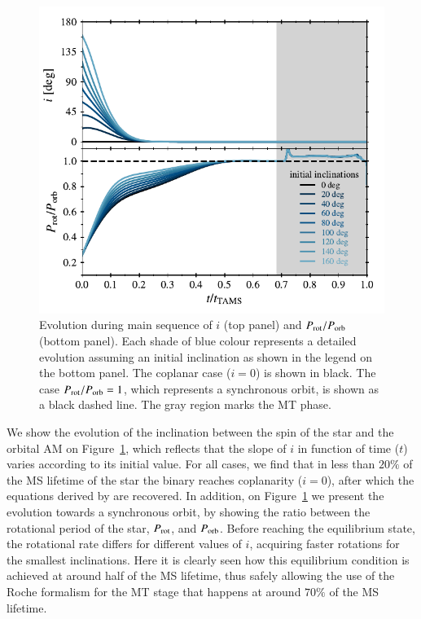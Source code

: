 \documentclass{aa}
\begin{document}
\begin{figure}
   \centering
   \includegraphics[width=\hsize]{figures/orbital_params2_evolution_caseA.pdf}
   \caption{Evolution during main sequence of $i$ (top panel) and $P_{\rm rot}/P_{\rm orb}$ (bottom panel). Each shade of blue colour
      represents a detailed evolution assuming an initial inclination as shown in the legend on the bottom panel. The coplanar case
      ($i = 0$) is shown in black. The case  $P_{\rm rot}/P_{\rm orb} = 1$, which represents a synchronous orbit, is shown as a black
      dashed line. The gray region marks the MT phase.}
   \label{fig:orbital_params2_evolution_caseA}
\end{figure}

We show the evolution of the inclination between the spin of the star and the orbital AM on
Figure~\ref{fig:orbital_params2_evolution_caseA}, which reflects that the slope of $i$ in function of time ($t$) varies according to its
initial value. For all cases, we find that in less than $20\%$ of the MS lifetime of the star the binary reaches coplanarity ($i=0$), after
which the equations derived by \citet{hut1981} are recovered. In addition, on Figure~\ref{fig:orbital_params2_evolution_caseA} we present
the evolution towards a synchronous orbit, by showing the ratio  between the rotational period of the star, $P_{\rm rot}$, and
$P_{\rm orb}$. Before reaching the equilibrium state, the rotational rate differs for different values of $i$, acquiring faster rotations
for the smallest inclinations. Here it is clearly seen how this equilibrium condition is achieved at around half of the MS lifetime, thus
safely allowing the use of the Roche formalism for the MT stage that happens at around $70\%$ of the MS lifetime.
\end{document}
